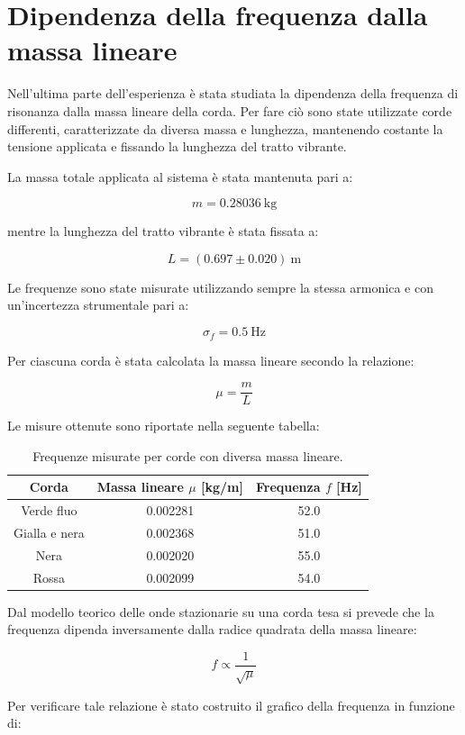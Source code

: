 \section{Dipendenza della frequenza dalla massa lineare}

Nell’ultima parte dell’esperienza è stata studiata la dipendenza della frequenza di risonanza dalla massa lineare della corda.  
Per fare ciò sono state utilizzate corde differenti, caratterizzate da diversa massa e lunghezza, mantenendo costante la tensione applicata e fissando la lunghezza del tratto vibrante.

La massa totale applicata al sistema è stata mantenuta pari a:

\[
m = 0.28036\ \text{kg}
\]

mentre la lunghezza del tratto vibrante è stata fissata a:

\[
L = (0.697 \pm 0.020)\ \text{m}
\]

Le frequenze sono state misurate utilizzando sempre la stessa armonica e con un’incertezza strumentale pari a:

\[
\sigma_f = 0.5\ \text{Hz}
\]

Per ciascuna corda è stata calcolata la massa lineare secondo la relazione:

\[
\mu = \frac{m}{L}
\]

Le misure ottenute sono riportate nella seguente tabella:

\begin{table}[H]
\centering
\begin{tabular}{ccc}
\hline
Corda & Massa lineare $\mu$ [kg/m] & Frequenza $f$ [Hz] \\
\hline
Verde fluo & 0.002281 & 52.0 \\
Gialla e nera & 0.002368 & 51.0 \\
Nera & 0.002020 & 55.0 \\
Rossa & 0.002099 & 54.0 \\
\hline
\end{tabular}
\caption{Frequenze misurate per corde con diversa massa lineare.}
\end{table}

Dal modello teorico delle onde stazionarie su una corda tesa si prevede che la frequenza dipenda inversamente dalla radice quadrata della massa lineare:

\[
f \propto \frac{1}{\sqrt{\mu}}
\]

Per verificare tale relazione è stato costruito il grafico della frequenza in funzione di:

